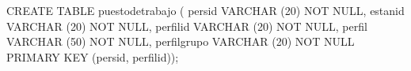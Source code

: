 \lstset{caption=Crear tabla ``puestosdetrabajo'',label=sql:crearTablaPuestosdetrabajo}
\begin{SQL}
CREATE TABLE puestodetrabajo (
persid VARCHAR (20) NOT NULL,
estanid VARCHAR (20) NOT NULL,
perfilid VARCHAR (20) NOT NULL,
perfil VARCHAR (50) NOT NULL,
perfilgrupo VARCHAR (20) NOT NULL
PRIMARY KEY (persid, perfilid));
\end{SQL}
